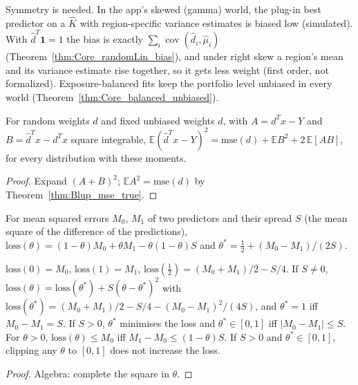 \begin{remark}[Finding 35]
  Symmetry is needed. In the app's skewed (gamma) world, the plug-in best predictor on a
  $\hat K$ with region-specific variance estimates is biased low (simulated). With
  $\hat d^T\mathbf 1 = 1$ the bias is exactly $\sum_i \operatorname{cov}(\hat d_i, \hat\mu_i)$
  (Theorem~\ref{thm:Core_randomLin_bias}), and under right skew a region's mean and its variance
  estimate rise together, so it gets less weight (first order, not formalized).
  Exposure-balanced fits keep the portfolio level unbiased in every world
  (Theorem~\ref{thm:Core_balanced_unbiased}).
\end{remark}

\begin{theorem}\label{thm:Blup_plugIn_mse}
  \leanok
  For random weights $\hat d$ and fixed unbiased weights $d$, with $A = d^Tx - Y$ and
  $B = \hat d^Tx - d^Tx$ square integrable,
  $\mathbb E(\hat d^Tx - Y)^2 = \mathrm{mse}(d) + \mathbb E B^2 + 2\,\mathbb E[AB]$, for every
  distribution with these moments.
\end{theorem}
\begin{proof}
  \leanok
  Expand $(A + B)^2$; $\mathbb E A^2 = \mathrm{mse}(d)$ by Theorem~\ref{thm:Blup_mse_true}.
\end{proof}

\begin{definition}\label{def:mixLoss}
  \leanok
  For mean squared errors $M_0$, $M_1$ of two predictors and their spread $S$ (the mean square of
  the difference of the predictions), $\mathrm{loss}(\theta) = (1-\theta)M_0 + \theta M_1
  - \theta(1-\theta)S$ and $\theta^* = \tfrac12 + (M_0 - M_1)/(2S)$.
\end{definition}

\begin{theorem}\label{thm:bestMix}
  \leanok
  $\mathrm{loss}(0) = M_0$, $\mathrm{loss}(1) = M_1$, $\mathrm{loss}(\tfrac12) = (M_0 + M_1)/2 - S/4$.
  If $S \ne 0$, $\mathrm{loss}(\theta) = \mathrm{loss}(\theta^*) + S(\theta - \theta^*)^2$ with
  $\mathrm{loss}(\theta^*) = (M_0 + M_1)/2 - S/4 - (M_0 - M_1)^2/(4S)$, and $\theta^* = 1$ iff
  $M_0 - M_1 = S$. If $S > 0$, $\theta^*$ minimises the loss and $\theta^* \in [0, 1]$ iff
  $|M_0 - M_1| \le S$. For $\theta > 0$, $\mathrm{loss}(\theta) \le M_0$ iff
  $M_1 - M_0 \le (1-\theta)S$. If $S > 0$ and $\theta^* \in [0,1]$, clipping any $\theta$ to $[0,1]$
  does not increase the loss.
\end{theorem}
\begin{proof}
  \leanok
  Algebra: complete the square in $\theta$.
\end{proof}

